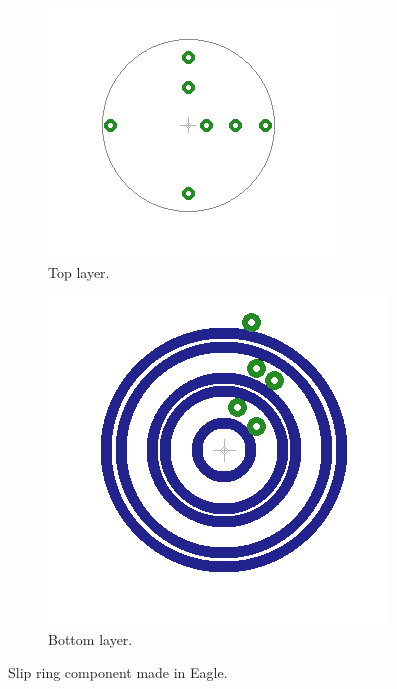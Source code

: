\begin{figure}[h]
 \centering
 \begin{subfigure}{0.4\linewidth}
 \centering
  \includegraphics[width=0.8\linewidth]{img/slip_ring_top}
 \caption{Top layer.}
 \label{fig:slip_ring_top}
 \end{subfigure}
 \begin{subfigure}{0.4\linewidth}
 \centering
  \includegraphics[width=0.8\linewidth]{img/slip_ring_bot}
 \caption{Bottom layer.}
 \label{fig:slip_ring_bot}
 \end{subfigure}
 \caption{Slip ring component made in Eagle.}
 \label{fig:slip_ring_eagle}
\end{figure}

%     

